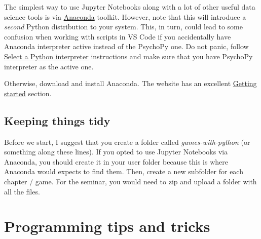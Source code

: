 \documentclass[
]{book}
\begin{document}
The simplest way to use Jupyter Notebooks along with a lot of other useful data science tools is via \href{https://www.anaconda.com/products/individual}{Anaconda} toolkit. However, note that this will introduce a \emph{second} Python distribution to your system. This, in turn, could lead to some confusion when working with scripts in VS Code if you accidentally have Anaconda interpreter active instead of the PsychoPy one. Do not panic, follow \href{https://code.visualstudio.com/docs/python/python-tutorial\#_select-a-python-interpreter}{Select a Python interpreter} instructions and make sure that you have PsychoPy interpreter as the active one.

Otherwise, download and install Anaconda. The website has an excellent \href{https://docs.anaconda.com/anaconda/user-guide/getting-started/}{Getting started} section.

\hypertarget{files-folder}{%
\section{Keeping things tidy}\label{files-folder}}

Before we start, I suggest that you create a folder called \emph{games-with-python} (or something along these lines). If you opted to use Jupyter Notebooks via Anaconda, you should create it in your user folder because this is where Anaconda would expects to find them. Then, create a new subfolder for each chapter / game. For the seminar, you would need to zip and upload a folder with all the files.

\hypertarget{programming-tips}{%
\chapter{Programming tips and tricks}\label{programming-tips}}
\end{document}
